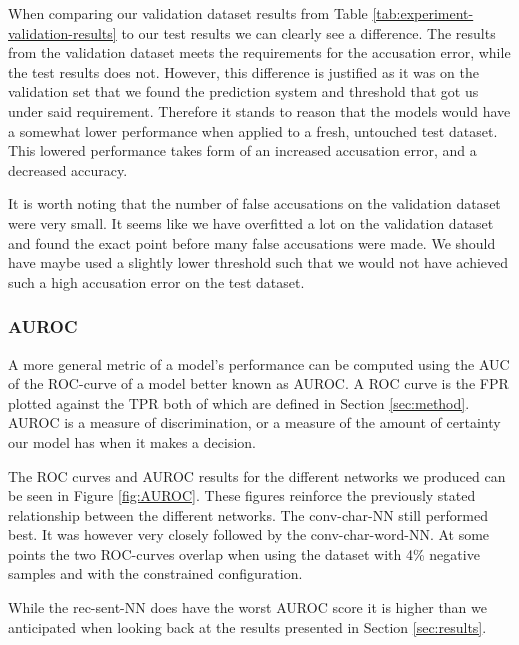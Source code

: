 When comparing our validation dataset results from Table
\ref{tab:experiment-validation-results} to our test results we can clearly see a
difference. The results from the validation dataset meets the requirements for
the accusation error, while the test results does not. However, this difference
is justified as it was on the validation set that we found the prediction system
and threshold that got us under said requirement. Therefore it stands to reason
that the models would have a somewhat lower performance when applied to a fresh,
untouched test dataset. This lowered performance takes form of an increased
accusation error, and a decreased accuracy.

It is worth noting that the number of false accusations on the validation
dataset were very small. It seems like we have overfitted a lot on the
validation dataset and found the exact point before many false accusations were
made. We should have maybe used a slightly lower threshold such that we would
not have achieved such a high accusation error on the test dataset.


\subsubsection{AUROC}

A more general metric of a model's performance can be computed using the
\gls{AUC} of the \gls{ROC}-curve of a model better known as \gls{AUROC}.
A \gls{ROC} curve is the \gls{FPR} plotted against the \gls{TPR} both of
which are defined in Section \ref{sec:method}. \gls{AUROC} is a measure of
discrimination, or a measure of the amount of certainty our model has when it
makes a decision.

The ROC curves and AUROC results for the different networks we produced
can be seen in Figure \ref{fig:AUROC}. These figures reinforce the
previously stated relationship between the different networks. The
\gls{conv-char-NN} still performed best. It was however very closely followed
by the \gls{conv-char-word-NN}. At some points the two \gls{ROC}-curves overlap
when using the dataset with 4\% negative samples and with the constrained
configuration.

While the \gls{rec-sent-NN} does have the worst AUROC score it is higher
than we anticipated when looking back at the results presented in Section
\ref{sec:results}. 


